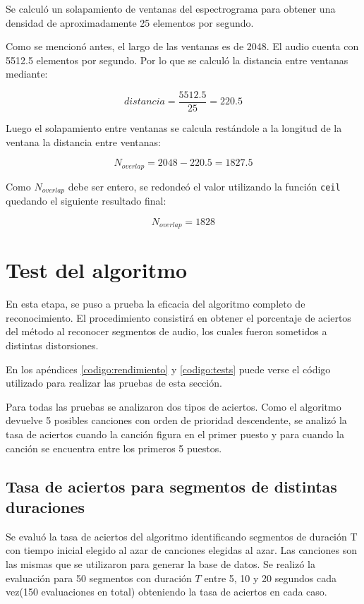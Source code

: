 \documentclass[10pt,spanish,a4paper,openany,notitlepage]{article}
\begin{document}
Se calculó un solapamiento de ventanas del espectrograma para
obtener una densidad de aproximadamente 25 elementos por segundo.

Como se mencionó antes, el largo de las ventanas es de 2048. El audio
cuenta con 5512.5 elementos por segundo. Por lo que se calculó la
distancia entre ventanas mediante:

\[ \displaystyle distancia = \frac{5512.5}{25} = 220.5 \]

Luego el solapamiento entre ventanas se calcula restándole a la longitud
de la ventana la distancia entre ventanas:

\[ \displaystyle N_{overlap} = 2048 - 220.5 = 1827.5 \]

Como $N_{overlap}$ debe ser entero, se redondeó el valor utilizando
la función \texttt{ceil} quedando el siguiente resultado final:

\[ \displaystyle N_{overlap} = 1828 \]

\section{Test del algoritmo}

En esta etapa, se puso a prueba la eficacia del algoritmo completo
de reconocimiento. El procedimiento consistirá en obtener el porcentaje
de aciertos del método al reconocer segmentos de audio, los cuales fueron
sometidos a distintas distorsiones.

En los apéndices \ref{codigo:rendimiento} y \ref{codigo:tests} puede
verse el código utilizado para realizar las pruebas de esta sección.

Para todas las pruebas se analizaron dos tipos de aciertos. Como el algoritmo
devuelve 5 posibles canciones con orden de prioridad descendente, se analizó 
la tasa de aciertos cuando la canción figura en el primer puesto y para 
cuando la canción se encuentra entre los primeros 5 puestos.

\subsection{Tasa de aciertos para segmentos de distintas duraciones}
\label{section:test}

Se evaluó la tasa de aciertos del algoritmo identificando segmentos
de duración T con tiempo inicial elegido al azar de canciones elegidas
al azar. Las canciones son las mismas que se utilizaron para generar
la base de datos. Se realizó la evaluación para 50 segmentos con
duración $T$ entre 5, 10 y 20 segundos cada vez(150 evaluaciones en total)
obteniendo la tasa de aciertos en cada caso.
\end{document}
